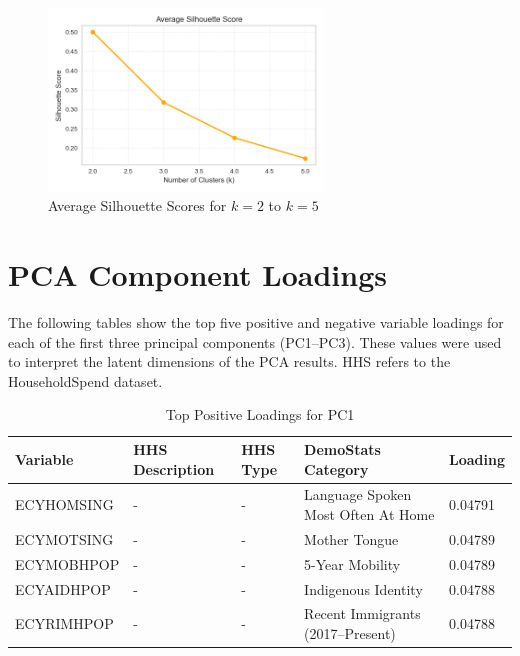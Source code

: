 \documentclass{article}
\begin{document}
\begin{figure}[H]
    \centering
    \includegraphics[width=0.65\textwidth]{figures/silhouette_scores.png}
    \caption{Average Silhouette Scores for $k=2$ to $k=5$}
    \label{fig:silhouette_scores}
\end{figure}


\section{PCA Component Loadings}

The following tables show the top five positive and negative variable loadings for each of the first three principal components (PC1–PC3). These values were used to interpret the latent dimensions of the PCA results. HHS refers to the HouseholdSpend dataset.

\begin{table}[H]
\centering
\caption{Top Positive Loadings for PC1}
\label{tab:pc1_pos}
\begin{tabular}{@{}lllll@{}}
\toprule
Variable & HHS Description & HHS Type & DemoStats Category & Loading \\
\midrule
ECYHOMSING & - & - & Language Spoken Most Often At Home & 0.04791 \\
ECYMOTSING & - & - & Mother Tongue & 0.04789 \\
ECYMOBHPOP & - & - & 5-Year Mobility & 0.04789 \\
ECYAIDHPOP & - & - & Indigenous Identity & 0.04788 \\
ECYRIMHPOP & - & - & Recent Immigrants (2017–Present) & 0.04788 \\
\bottomrule
\end{tabular}
\end{table}
\end{document}
